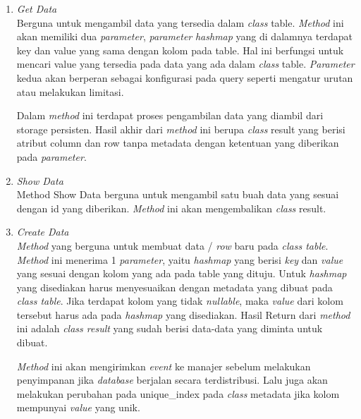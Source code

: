 \begin{enumerate}
	\item \emph{Get Data} \\
	Berguna untuk mengambil data yang tersedia dalam \emph{class} table. \emph{Method} ini akan 
  memiliki dua \emph{parameter}, \emph{parameter} \emph{hashmap} yang di dalamnya terdapat key dan value 
  yang sama dengan kolom pada table. Hal ini berfungsi untuk mencari value yang 
  tersedia pada data yang ada dalam \emph{class} table. \emph{Parameter} kedua akan berperan 
  sebagai konfigurasi pada query seperti mengatur urutan atau melakukan limitasi.

  Dalam \emph{method} ini terdapat proses pengambilan data yang diambil dari storage 
  persisten. Hasil akhir dari \emph{method} ini berupa \emph{class} result yang berisi atribut 
  column dan row tanpa metadata dengan ketentuan yang diberikan pada \emph{parameter}.


	\item \emph{Show Data} \\
	Method Show Data berguna untuk mengambil satu buah data yang sesuai dengan id 
  yang diberikan. \emph{Method} ini akan mengembalikan \emph{class} result.


	\item \emph{Create Data} \\
  \emph{Method} yang berguna untuk membuat data / \emph{row} baru pada \emph{class table}. \emph{Method} 
  ini menerima 1 \emph{parameter}, yaitu \emph{hashmap} yang berisi \emph{key} dan \emph{value} yang sesuai 
  dengan kolom yang ada pada table yang dituju. Untuk \emph{hashmap} yang disediakan 
  harus menyesuaikan dengan metadata yang dibuat pada \emph{class table}. Jika terdapat 
  kolom yang tidak \emph{nullable}, maka \emph{value} dari kolom tersebut harus ada pada 
  \emph{hashmap} yang disediakan. Hasil Return dari \emph{method} ini adalah \emph{class result} yang 
  sudah berisi data-data yang diminta untuk dibuat.  

  \emph{Method} ini akan mengirimkan \emph{event} ke manajer sebelum melakukan penyimpanan 
  jika \emph{database} berjalan secara terdistribusi. Lalu juga akan melakukan perubahan 
  pada unique\_index pada \emph{class} metadata jika kolom mempunyai \emph{value} yang unik.


\end{enumerate}
